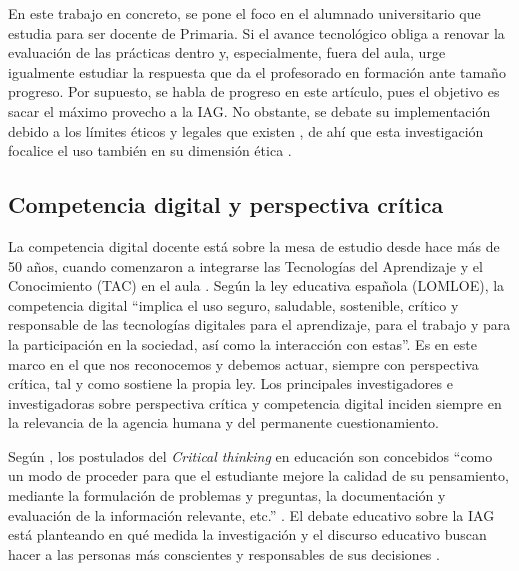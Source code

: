 \documentclass[spanish]{textolivre}
\begin{document}
En este trabajo en concreto, se pone el foco en el alumnado universitario que estudia para ser docente de Primaria. Si el avance tecnológico obliga a renovar la evaluación de las prácticas dentro y, especialmente, fuera del aula, urge \cite{PeschanskiJurnoHilsenbeck2025} igualmente estudiar la respuesta que da el profesorado en formación ante tamaño progreso. Por supuesto, se habla de progreso en este artículo, pues el objetivo es sacar el máximo provecho a la IAG. No obstante, se debate su implementación debido a los límites éticos y legales que existen \cite{MartinezGonzalez2023}, de ahí que esta investigación focalice el uso también en su dimensión ética \cite{Cortina2024}.

\subsection{Competencia digital y perspectiva crítica}\label{sec-conduta}
La competencia digital docente está sobre la mesa de estudio desde hace más de 50 años, cuando comenzaron a integrarse las Tecnologías del Aprendizaje y el Conocimiento (TAC) en el aula \cite{RomanMendoza2018}. Según la ley educativa española (LOMLOE), la competencia digital “implica el uso seguro, saludable, sostenible, crítico y responsable de las tecnologías digitales para el aprendizaje, para el trabajo y para la participación en la sociedad, así como la interacción con estas”. Es en este marco en el que nos reconocemos y debemos actuar, siempre con perspectiva crítica, tal y como sostiene la propia ley. Los principales investigadores e investigadoras sobre perspectiva crítica y competencia digital inciden siempre en la relevancia de la agencia humana y del permanente cuestionamiento.

Según \textcite{AscasoAtienza2018}, los postulados del \textit{Critical thinking} en educación son concebidos “como un modo de proceder para que el estudiante mejore la calidad de su pensamiento, mediante la formulación de problemas y preguntas, la documentación y evaluación de la información relevante, etc.” \cite[p. 124]{AscasoAtienza2018}. El debate educativo sobre la IAG está planteando en qué medida la investigación y el discurso educativo buscan hacer a las personas más conscientes y responsables de sus decisiones \cite{Castaneda2019}.
\end{document}

